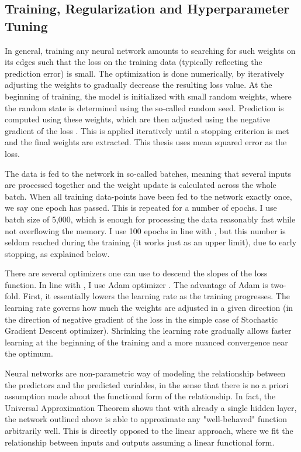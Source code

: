 	
	\subsection{Training, Regularization and Hyperparameter Tuning}
		\label{chap:train_regularize_tune}
	
		In general, training any neural network amounts to searching for such weights on its edges such that the loss on the training data (typically reflecting the prediction error) is small. The optimization is done numerically, by iteratively adjusting the weights to gradually decrease the resulting loss value. At the beginning of training, the model is initialized with small random weights, where the random state is determined using the so-called random seed. Prediction is computed using these weights, which are then adjusted using the negative gradient of the loss \citep{kingma2014adam}. This is applied iteratively until a stopping criterion is met and the final weights are extracted. This thesis uses mean squared error as the loss.
		
		The data is fed to the network in so-called batches, meaning that several inputs are processed together and the weight update is calculated across the whole batch. When all training data-points have been fed to the network exactly once, we say one epoch has passed. This is repeated for a number of epochs. I use batch size of 5,000, which is enough for processing the data reasonably fast while not overflowing the memory. I use 100 epochs in line with \cite{gu2020empirical}, but this number is seldom reached during the training (it works just as an upper limit), due to early stopping, as explained below.
		
		There are several optimizers one can use to descend the slopes of the loss function. In line with \cite{gu2020empirical}, I use Adam optimizer \citep{kingma2014adam}. The advantage of Adam is two-fold. First, it essentially lowers the learning rate as the training progresses. The learning rate governs how much the weights are adjusted in a given direction (in the direction of negative gradient of the loss in the simple case of Stochastic Gradient Descent optimizer). Shrinking the learning rate gradually allows faster learning at the beginning of the training and a more nuanced convergence near the optimum.
		
		Neural networks are non-parametric way of modeling the relationship between the predictors and the predicted variables, in the sense that there is no a priori assumption made about the functional form of the relationship. In fact, the Universal Approximation Theorem shows that with already a single hidden layer, the network outlined above is able to approximate any "well-behaved" function arbitrarily well. This is directly opposed to the linear approach, where we fit the relationship between inputs and outputs assuming a linear functional form. 
		
